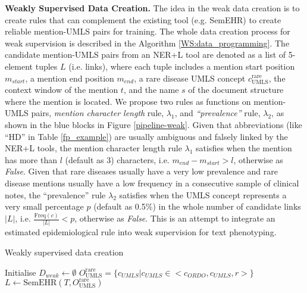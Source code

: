 \documentclass[twocolumn]{bmcart}
\begin{document}
\textbf{Weakly Supervised Data Creation.} The idea in the weak data creation is to create rules that can complement the existing tool (e.g. SemEHR) to create reliable mention-UMLS pairs for training. The whole data creation process for weak supervision is described in the Algorithm \ref{WS:data_programming}. The candidate mention-UMLS pairs from an NER+L tool are denoted as a list of 5-element tuples $L$ (i.e. links), where each tuple includes a mention start position $m_{start}$, a mention end position $m_{end}$, a rare disease UMLS concept $c^{\text{rare}}_{\text{UMLS}}$, the context window of the mention $t$, and the name $s$ of the document structure where the mention is located. We propose two rules as functions on mention-UMLS pairs, \textit{mention character length} rule, $\lambda_1$, and \textit{``prevalence''} rule, $\lambda_2$, as shown in the blue blocks in Figure \ref{pipeline-weak}. Given that abbreviations (like ``HD'' in Table \ref{fp_example}) are usually ambiguous and falsely linked by the NER+L tools, the mention character length rule $\lambda_1$ satisfies when the mention has more than $l$ (default as 3) characters, i.e. $m_{end} - m_{start} > l$, otherwise as \emph{False}. Given that rare diseases usually have a very low prevalence \cite{scot_gov_2021,textoris_genetic_2014} and rare disease mentions usually have a low frequency in a consecutive sample of clinical notes, the ``prevalence'' rule $\lambda_2$ satisfies when the UMLS concept represents a very small percentage $p$ (default as 0.5\%) in the whole number of candidate links $|L|$, i.e. $\frac{\text{Freq}(c)}{|L|} < p$, otherwise as \emph{False}. This is an attempt to integrate an estimated epidemiological rule into weak supervision for text phenotyping.

\begin{algorithm}[t]
\caption{Weakly supervised data creation}

\label{WS:data_programming}
\SetAlgoLined
{}

Initialise $D_{weak} \gets \emptyset$\;
\small{$O^{\text{rare}}_{\text{UMLS}} = \{c_{UMLS} |c_{UMLS} \in <c_{ORDO},c_{UMLS},r> \}$\;}
$L \gets \text{SemEHR}(T,O^{\text{rare}}_{\text{UMLS}})$\;
\end{algorithm}
\end{document}
